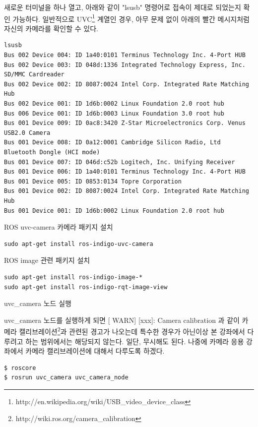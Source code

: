 \noindent
새로운 터미널을 하나 열고, 아래와 같이 "lsusb" 명령어로 접속이 제대로 되었는지 확인 가능하다. 일반적으로 UVC\footnote{http://en.wikipedia.org/wiki/USB\_video\_device\_class} 계열인 경우, 아무 문제 없이 아래의 빨간 메시지처럼 자신의 카메라를 확인할 수 있다. 

\begin{lstlisting}[language=ROS]
lsusb
Bus 002 Device 004: ID 1a40:0101 Terminus Technology Inc. 4-Port HUB
Bus 002 Device 003: ID 048d:1336 Integrated Technology Express, Inc. SD/MMC Cardreader
Bus 002 Device 002: ID 8087:0024 Intel Corp. Integrated Rate Matching Hub
Bus 002 Device 001: ID 1d6b:0002 Linux Foundation 2.0 root hub
Bus 006 Device 001: ID 1d6b:0003 Linux Foundation 3.0 root hub
Bus 001 Device 009: ID 0ac8:3420 Z-Star Microelectronics Corp. Venus USB2.0 Camera
Bus 001 Device 008: ID 0a12:0001 Cambridge Silicon Radio, Ltd Bluetooth Dongle (HCI mode)
Bus 001 Device 007: ID 046d:c52b Logitech, Inc. Unifying Receiver
Bus 001 Device 006: ID 1a40:0101 Terminus Technology Inc. 4-Port HUB
Bus 001 Device 005: ID 0853:0134 Topre Corporation 
Bus 001 Device 002: ID 8087:0024 Intel Corp. Integrated Rate Matching Hub
Bus 001 Device 001: ID 1d6b:0002 Linux Foundation 2.0 root hub
\end{lstlisting}

\noindent
{}\circled{\thenum} ROS uvc-camera 카메라 패키지 설치

\begin{lstlisting}[language=ROS]
sudo apt-get install ros-indigo-uvc-camera
\end{lstlisting}

\noindent
{}\circled{\thenum} ROS image 관련 패키지 설치

\begin{lstlisting}[language=ROS]
sudo apt-get install ros-indigo-image-*
sudo apt-get install ros-indigo-rqt-image-view 
\end{lstlisting}

\noindent
{}\circled{\thenum} uvc\_camera 노드 실행

\noindent
uvc\_camera 노드를 실행하게 되면 [ WARN] [xxx]: Camera calibration 과 같이 카메라 캘리브레이션\footnote{http://wiki.ros.org/camera\_calibration}과 관련된 경고가 나오는데 특수한 경우가 아닌이상 본 강좌에서 다루려고 하는 범위에서는 해당되지 않는다. 일단, 무시해도 된다. 나중에 카메라 응용 강좌에서 카메라 캘리브레이션에 대해서 다루도록 하겠다.

\begin{lstlisting}[language=ROS]
$ roscore
$ rosrun uvc_camera uvc_camera_node
\end{lstlisting}

